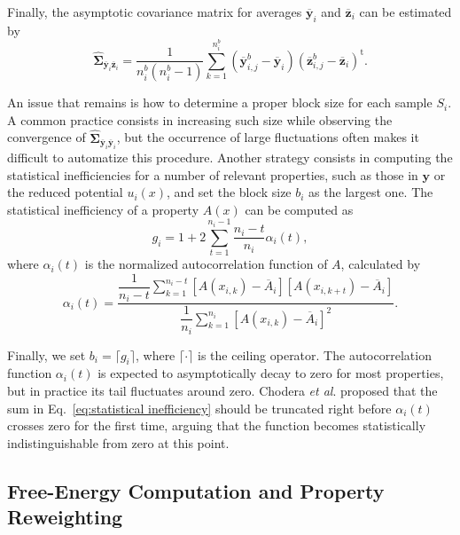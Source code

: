 \documentclass[aip,jcp,reprint,amsmath,amssymb]{revtex4-1}
\newcommand{\mt}[1]{\boldsymbol{\mathbf{#1}}}           %
\newcommand{\vt}[1]{\boldsymbol{\mathbf{#1}}}           %
\newcommand{\tr}[1]{#1^\text{t}}                        %
\begin{document}
Finally, the asymptotic covariance matrix for averages $\overline{\vt y}_i$ and $\overline{\vt z}_i$ can be estimated by\cite{Geyer_1992, X}
\begin{equation}
\label{eq:block asymptotic covariance}
\hat{\mt \Sigma}_{\overline{\vt y}_i\overline{\vt z}_i} = \frac{1}{n^b_i(n^b_i - 1)} \sum\limits_{k=1}^{n^b_i} ({\overline{\vt y}}^b_{i,j} - \overline{\vt y}_i) \tr{({\overline{\vt z}}^b_{i,j} - \overline{\vt z}_i)}.
\end{equation}

An issue that remains is how to determine a proper block size for each sample $S_i$. A common practice consists in increasing such size while observing the convergence of $\hat{\mt \Sigma}_{\overline{\vt y}_i\overline{\vt y}_i}$, but the occurrence of large fluctuations often makes it difficult to automatize this procedure. Another strategy consists in computing the statistical inefficiencies for a number of relevant properties, such as those in $\vt y$ or the reduced potential $u_i(x)$, and set the block size $b_i$ as the largest one. The statistical inefficiency of a property $A(x)$ can be computed as\cite{Chodera_2007}
\begin{equation}
\label{eq:statistical inefficiency}
g_i = 1 + 2 \sum\limits_{t=1}^{n_i-1} \frac{n_i - t}{n_i} \alpha_i(t),
\end{equation}
where $\alpha_i(t)$ is the normalized autocorrelation function of $A$, calculated by
\begin{equation*}
\alpha_i(t) = \frac{\dfrac{1}{n_i - t} \sum\limits_{k=1}^{n_i-t} \left[A(x_{i,k}) - \overline A_i\right]\left[A(x_{i,k+t}) - \overline A_i\right]}{\dfrac{1}{n_i} \sum\limits_{k=1}^{n_i} \left[A(x_{i,k}) - \overline A_i\right]^2}.
\end{equation*}

Finally, we set $b_i = \lceil g_i \rceil$, where $\lceil \cdot \rceil$ is the ceiling operator. The autocorrelation function $\alpha_i(t)$ is expected to asymptotically decay to zero for most properties, but in practice its tail fluctuates around zero. Chodera \textit{et al}.\cite{Chodera_2007} proposed that the sum in Eq.~\eqref{eq:statistical inefficiency} should be truncated right before $\alpha_i(t)$ crosses zero for the first time, arguing that the function becomes statistically indistinguishable from zero at this point.

\subsection{Free-Energy Computation and Property Reweighting}
\end{document}
